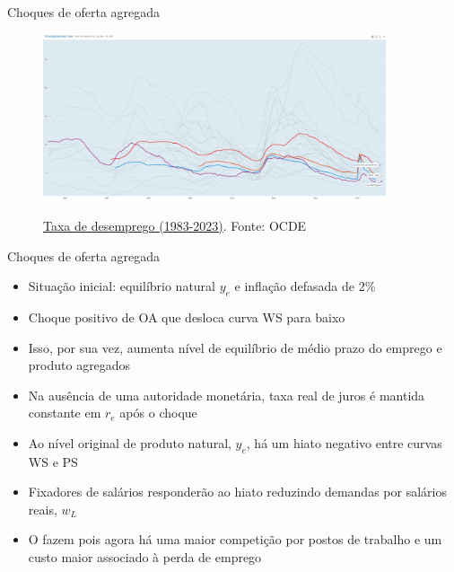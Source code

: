 \documentclass[10pt]{beamer}
\begin{document}
\begin{frame}
    {Choques de oferta agregada}
    \begin{figure}
        \href{https://data.oecd.org/chart/6Ujt}{\includegraphics[width=0.9\textwidth]{./figures/aula14_fig5.PNG}}
        \caption{\href{https://data.oecd.org/chart/6Ujt}{Taxa de desemprego (1983-2023)}. Fonte: OCDE}
    \end{figure}
\end{frame}

\begin{frame}
    {Choques de oferta agregada}
    \begin{itemize}
        \item Situação inicial: equilíbrio natural $y_e$ e inflação defasada de 2\%\bigskip
        \item Choque positivo de OA que desloca curva WS para baixo\bigskip
        \item Isso, por sua vez, aumenta nível de equilíbrio de médio prazo do emprego e produto agregados\bigskip
        \item Na ausência de uma autoridade monetária, taxa real de juros é mantida constante em $r_e$ após o choque\bigskip
        \item Ao nível original de produto natural, $y_e$, há um hiato negativo entre curvas WS e PS\bigskip
        \item Fixadores de salários responderão ao hiato reduzindo demandas por salários reais, $w_L$\bigskip
        \item O fazem pois agora há uma maior competição por postos de trabalho e um custo maior associado à perda de emprego
    \end{itemize}
\end{frame}
\end{document}
